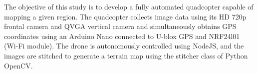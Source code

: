 \documentclass[
  journal=largetwo,
  manuscript=article-type,
  year=2023,
  volume=1,
]{iitp-journal}
\begin{document}
The objective of this study is to develop a fully automated quadcopter capable of mapping a given region. The quadcopter collects image data using its HD 720p frontal camera and QVGA vertical camera and simultaneously obtains GPS coordinates using an Arduino Nano connected to U-blox GPS and NRF24l01 (Wi-Fi module). The drone is autonomously controlled using NodeJS, and the images are stitched to generate a terrain map using the stitcher class of Python OpenCV.




\end{document}
